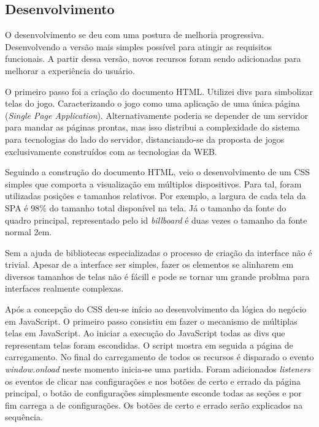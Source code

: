 \begin{draft}
\section{Desenvolvimento}

O desenvolvimento se deu com uma postura de melhoria progressiva.
Desenvolvendo a versão mais simples possível para atingir as
requisitos funcionais. A partir dessa versão, novos recursos foram
sendo adicionadas para melhorar a experiência do usuário.

O primeiro passo foi a criação do documento HTML. Utilizei divs
para simbolizar telas do jogo. Caracterizando o jogo como uma
aplicação de uma única página (\textit{Single Page Application}).
Alternativamente poderia se depender de um servidor para mandar as
páginas prontas, mas isso distribui a complexidade do sistema para
tecnologias do lado do servidor, distanciando-se da proposta de jogos
exclusivamente construídos com as tecnologias da WEB.

Seguindo a construção do documento HTML, veio o desenvolvimento de um
CSS simples que comporta a visualização em múltiplos dispositivos.
Para tal, foram utilizadas posições e tamanhos relativos. Por exemplo,
a largura de cada tela da SPA é 98\% do tamanho total disponível na
tela. Já o tamanho da fonte do quadro principal, representado pelo id
\textit{billboard} é duas vezes o tamanho da fonte normal 2em.

Sem a ajuda de bibliotecas especializadas o processo de criação da
interface não é trivial. Apesar de a interface ser simples, fazer os
elementos se alinharem em diversos tamanhos de telas não é fácill e
pode se tornar um grande problma para interfaces realmente complexas.

Após a concepção do CSS deu-se início ao desenvolvimento da lógica do 
negócio em JavaScript. O primeiro passo consistiu em fazer o mecanismo 
de múltiplas telas em JavaScript. Ao iniciar a execução do JavaScript
todas as divs que representam telas foram escondidas. O script mostra
em seguida a página de carregamento. No final do carregamento de todos 
os recursos é disparado o evento \textit{window.onload} neste momento
inicia-se uma partida. Foram adicionados  \textit{listeners} os eventos de 
clicar nas configurações e nos botões de certo e errado da página principal, 
o botão de configurações simplesmente esconde todas as seções  e por fim carrega
a de configurações. Os botões de certo e errado serão explicados na sequência.


\end{draft}
